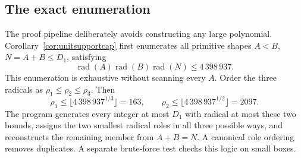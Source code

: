 \documentclass[11pt]{article}
\numberwithin{equation}{section}
\theoremstyle{definition}
\begin{document}
\subsection{The exact enumeration}

The proof pipeline deliberately avoids constructing any large polynomial.
Corollary~\ref{cor:unitsupportcap} first enumerates all primitive shapes
\(A<B\), \(N=A+B\leq D_1\), satisfying
\[
 \operatorname{rad}(A)\operatorname{rad}(B)\operatorname{rad}(N)
 \leq4\,398\,937.
\]
This enumeration is exhaustive without scanning every \(A\).  Order the
three radicals as \(\rho_1\leq\rho_2\leq\rho_3\).  Then
\[
 \rho_1\leq\lfloor4\,398\,937^{1/3}\rfloor=163,
 \qquad
 \rho_2\leq\lfloor4\,398\,937^{1/2}\rfloor=2097.
\]
The program generates every integer at most \(D_1\) with radical at most
these two bounds, assigns the two smallest radical roles in all three possible
ways, and reconstructs the remaining member from \(A+B=N\).  A canonical
role ordering removes duplicates.  A separate brute-force test checks this
logic on small boxes.
\end{document}
